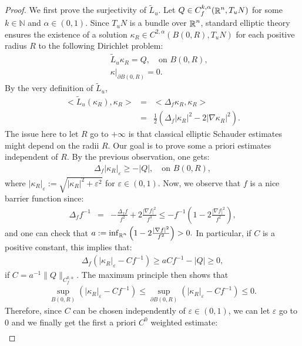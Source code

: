 \documentclass[a4paper,11pt,reqno]{amsart}
\def\R{\mathop{\rm \mathbb{R}}\nolimits}
\begin{document}
\begin{proof}
We first prove the surjectivity of $\tilde{L}_u$. Let $Q\in C_f^{k,\alpha}(\R^n,T_uN)$ for some $k\in \mathbb{N}$ and $\alpha\in(0,1)$. Since $T_uN$ is a bundle over $\R^n$, standard elliptic theory ensures the existence of a solution $\kappa_R\in C^{2,\alpha}(B(0,R),T_uN)$ for each positive radius $R$ to the following Dirichlet problem:
\begin{eqnarray*}
&&\tilde{L}_u\kappa_R=Q,\quad \text{on $B(0,R)$},\\
&&\kappa|_{\partial B(0,R)}=0.
\end{eqnarray*}
By the very definition of $\tilde{L}_u$, 
\begin{eqnarray*}
<\tilde{L}_u(\kappa_R),\kappa_R>&=&<\Delta_f\kappa_R,\kappa_R>\\
&=&\frac{1}{2}\left(\Delta_f|\kappa_R|^2-2|\nabla \kappa_R|^2\right).
\end{eqnarray*}
The issue here to let $R$ go to $+\infty$ is that classical elliptic Schauder estimates might depend on the radii $R$. Our goal is to prove some a priori estimates independent of $R$. By the previous observation, one gets:
\begin{eqnarray*}
\Delta_f|\kappa_R|_{\varepsilon}\geq -|Q|,\quad \text{on $B(0,R)$},
\end{eqnarray*}
where $|\kappa_R|_{\varepsilon}:=\sqrt{|\kappa_R|^2+\varepsilon^2}$ for $\varepsilon\in(0,1)$. Now, we observe that $f$ is a nice barrier function since:
\begin{eqnarray*}
\Delta_ff^{-1}&=&-\frac{\Delta_ff}{f^2}+2\frac{|\nabla f|^2}{f^3}\leq-f^{-1}\left(1-2\frac{|\nabla f|^2}{f^2}\right),
\end{eqnarray*}
and one can check that $a:=\inf_{\R^n}\left(1-2\frac{|\nabla f|^2}{f^2}\right)>0.$ In particular, if $C$ is a positive constant, this implies that:
\begin{eqnarray*}
\Delta_f\left(|\kappa_R|_{\varepsilon}-Cf^{-1}\right)\geq aCf^{-1} -|Q|\geq 0,
\end{eqnarray*}
if $C= a^{-1}\|Q\|_{C^{0,\alpha}_f}.$  The maximum principle then shows that 
\begin{eqnarray*}
\sup_{B(0,R)}\left(|\kappa_R|_{\varepsilon}-Cf^{-1}\right)\leq \sup_{\partial B(0,R)}\left(|\kappa_R|_{\varepsilon}-Cf^{-1}\right)\leq 0.
\end{eqnarray*}
Therefore, since $C$ can be chosen independently of $\varepsilon\in(0,1)$, we can let $\varepsilon$ go to $0$ and we finally get the first a priori $C^0$ weighted estimate:
\begin{eqnarray*}

\end{eqnarray*}
\end{proof}
\end{document}
